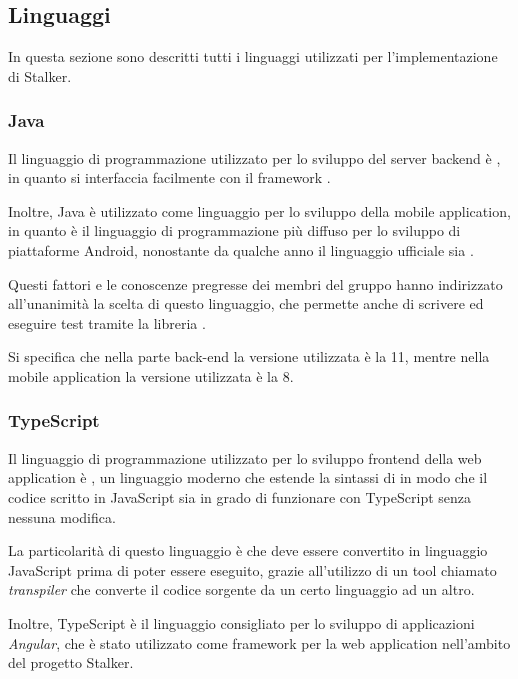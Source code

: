 \documentclass[../../../manuale-sviluppatore.tex]{subfiles}
\begin{document}
\subsection{Linguaggi}%
\label{sub:linguaggi}
In questa sezione sono descritti tutti i linguaggi utilizzati per l'implementazione di Stalker.

\subsubsection{Java}%
\label{subs:java}

Il linguaggio di programmazione utilizzato per lo sviluppo del server backend è , in quanto si interfaccia facilmente con il framework .

Inoltre, Java è utilizzato come linguaggio per lo sviluppo della mobile application, in quanto è il linguaggio di programmazione più diffuso per lo sviluppo di piattaforme Android, nonostante da qualche anno il linguaggio ufficiale sia . 

Questi fattori e le conoscenze pregresse dei membri del gruppo hanno indirizzato all'unanimità la scelta di questo linguaggio, che permette anche di scrivere ed eseguire test tramite la libreria .

Si specifica che nella parte back-end la versione utilizzata è la 11, mentre nella mobile application la versione utilizzata è la 8.

\subsubsection{TypeScript}%
\label{subs:typescript}

Il linguaggio di programmazione utilizzato per lo sviluppo frontend della web application è , un linguaggio moderno che estende la sintassi di  in modo che il codice scritto in JavaScript sia in grado di funzionare con TypeScript senza nessuna modifica.

La particolarità di questo linguaggio è che deve essere convertito in linguaggio JavaScript prima di poter essere eseguito, grazie all'utilizzo di un tool chiamato \textit{transpiler} che converte il codice sorgente da un certo linguaggio ad un altro.

Inoltre, TypeScript è il linguaggio consigliato per lo sviluppo di applicazioni \textit{Angular}, che è stato utilizzato come framework per la web application nell'ambito del progetto Stalker.
\end{document}
